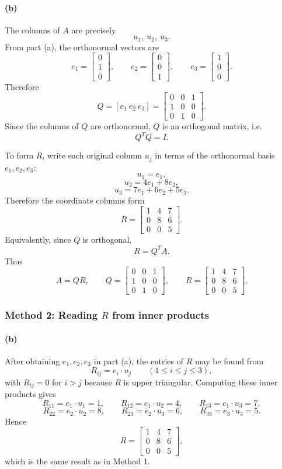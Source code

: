 \documentclass[12pt]{article}
\begin{document}
\paragraph{(b)}
The columns of $A$ are precisely
\[
u_1,\ u_2,\ u_3.
\]
From part (a), the orthonormal vectors are
\[
e_1=\begin{bmatrix}0\\1\\0\end{bmatrix},
\qquad
e_2=\begin{bmatrix}0\\0\\1\end{bmatrix},
\qquad
e_3=\begin{bmatrix}1\\0\\0\end{bmatrix}.
\]
Therefore
\[
Q=[e_1\ e_2\ e_3]
=\begin{bmatrix}
0&0&1\\
1&0&0\\
0&1&0
\end{bmatrix}.
\]
Since the columns of $Q$ are orthonormal, $Q$ is an orthogonal matrix, i.e.
\[
Q^TQ=I.
\]

To form $R$, write each original column $u_j$ in terms of the orthonormal basis $e_1,e_2,e_3$:
\[
u_1=e_1,
\]
\[
u_2=4e_1+8e_2,
\]
\[
u_3=7e_1+6e_2+5e_3.
\]
Therefore the coordinate columns form
\[
R=
\begin{bmatrix}
1&4&7\\
0&8&6\\
0&0&5
\end{bmatrix}.
\]
Equivalently, since $Q$ is orthogonal,
\[
R=Q^TA.
\]
Thus
\[
\boxed{
A=QR,
\qquad
Q=\begin{bmatrix}0&0&1\\1&0&0\\0&1&0\end{bmatrix},
\qquad
R=\begin{bmatrix}1&4&7\\0&8&6\\0&0&5\end{bmatrix}.}
\]

\subsubsection{Method 2: Reading $R$ from inner products}

\paragraph{(b)}
After obtaining $e_1,e_2,e_3$ in part (a), the entries of $R$ may be found from
\[
R_{ij}=e_i\cdot u_j\qquad (1\le i\le j\le3),
\]
with $R_{ij}=0$ for $i>j$ because $R$ is upper triangular.
Computing these inner products gives
\[
R_{11}=e_1\cdot u_1=1,
\qquad
R_{12}=e_1\cdot u_2=4,
\qquad
R_{13}=e_1\cdot u_3=7,
\]
\[
R_{22}=e_2\cdot u_2=8,
\qquad
R_{23}=e_2\cdot u_3=6,
\qquad
R_{33}=e_3\cdot u_3=5.
\]
Hence
\[
R=
\begin{bmatrix}
1&4&7\\
0&8&6\\
0&0&5
\end{bmatrix},
\]
which is the same result as in Method 1.
\end{document}
